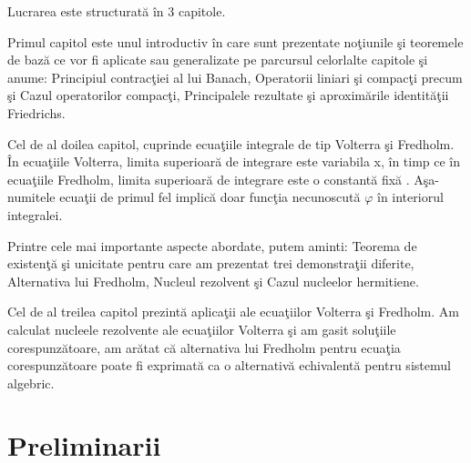 \documentclass[a4paper,12pt,oneside]{report}
\begin{document}
Lucrarea este structurat\u{a} \^{i}n 3 capitole. 

Primul capitol este unul introductiv \^{i}n care sunt prezentate no\c{t}iunile \c{s}i teoremele de baz\u{a} ce vor fi aplicate sau generalizate pe parcursul celorlalte capitole \c{s}i anume: Principiul contrac\c{t}iei al lui Banach, Operatorii liniari \c{s}i compac\c{t}i precum \c{s}i Cazul operatorilor compac\c{t}i, Principalele rezultate \c{s}i aproxim\u{a}rile identit\u{a}\c{t}ii Friedrichs.

Cel de al doilea capitol, cuprinde ecua\c{t}iile integrale de tip Volterra \c{s}i Fredholm. \^{I}n ecua\c{t}iile Volterra, limita superioar\u{a} de integrare este variabila x, \^{i}n timp ce \^{i}n ecua\c{t}iile Fredholm, limita superioar\u{a} de integrare este o constant\u{a} fix\u{a} . A\c{s}a-numitele ecua\c{t}ii de primul fel implic\u{a} doar func\c{t}ia necunoscut\u{a} \(\varphi \) \^{i}n interiorul integralei.

Printre cele mai importante aspecte abordate, putem aminti: Teorema de existen\c{t}\u{a} \c{s}i unicitate pentru care am prezentat trei demonstra\c{t}ii diferite, Alternativa lui Fredholm, Nucleul rezolvent \c{s}i Cazul nucleelor hermitiene.

Cel de al treilea capitol prezint\u{a} aplica\c{t}ii ale ecua\c{t}iilor Volterra \c{s}i Fredholm. Am calculat nucleele rezolvente ale ecua\c{t}iilor Volterra \c{s}i am gasit solu\c{t}iile corespunz\u{a}toare, am ar\u{a}tat c\u{a} alternativa lui Fredholm pentru ecua\c{t}ia corespunz\u{a}toare poate fi exprimat\u{a} ca o alternativ\u{a} echivalent\u{a} pentru  sistemul algebric.



%
%
%
%

\chapter{Preliminarii}

\nocite{morosanu}
\nocite{kreyszig}
\end{document}
